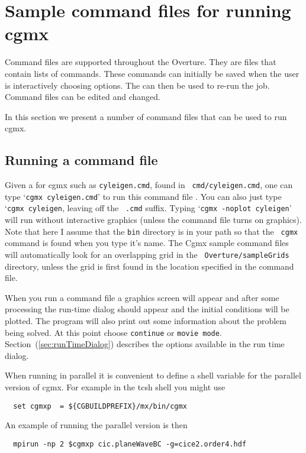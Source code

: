\section{Sample command files for running cgmx} \label{sec:demo}

Command files are supported throughout the Overture. They are files
that contain lists of commands. These commands can initially be saved
when the user is interactively choosing options.  The 
can then be used to re-run the job. Command files can be edited and
changed.

In this section we present a number of command files that can be used
to run cgmx.

\subsection{Running a command file} \label{sec:runningCommandFiles} 

Given a  for cgmx such as {\tt cyleigen.cmd}, found in {\tt
cmd/cyleigen.cmd}, one can type `{\tt cgmx cyleigen.cmd}' to run this command
file . You can also just type `{\tt cgmx cyleigen}, leaving off the {\tt
.cmd} suffix. Typing `{\tt cgmx -noplot cyleigen}' will run without
interactive graphics (unless the command file turns on graphics). Note that here
I assume that the {\tt bin} directory is in your path so that the {\tt
cgmx} command is found when you type it's name. The Cgmx sample
command files will automatically look for an overlapping grid in the {\tt
Overture/sampleGrids} directory, unless the grid is first found in the location
specified in the command file.

When you run a command file a graphics screen will appear and after some
processing the run-time dialog should appear and the initial conditions will be
plotted. The program will also print out some information about the problem
being solved. At this point choose {\tt continue} or {\tt movie
mode}. Section~(\ref{sec:runTimeDialog}) describes the options available in the
run time dialog.

When running in parallel it is convenient to define a shell variable for the parallel
version of cgmx.
For example in the tcsh shell you might use
\begin{verbatim}
  set cgmxp  = ${CGBUILDPREFIX}/mx/bin/cgmx
\end{verbatim} %
An example of running the parallel version is then
\begin{verbatim}
  mpirun -np 2 $cgmxp cic.planeWaveBC -g=cice2.order4.hdf
\end{verbatim} %


